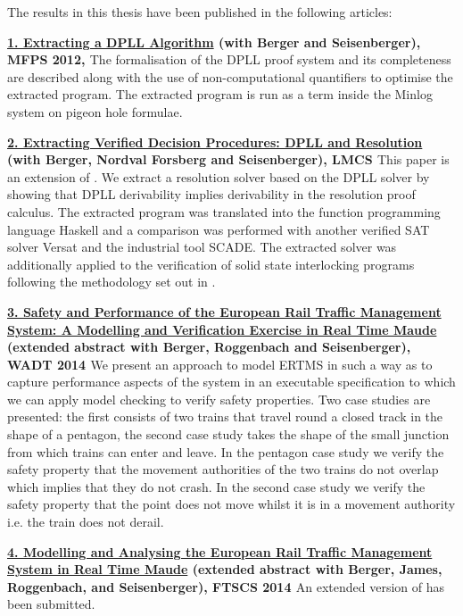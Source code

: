 The results in this thesis have been published in the following articles:

\textbf{\ul{1. Extracting a DPLL Algorithm} (with Berger and Seisenberger), MFPS 2012, \cite{AL12}}
The formalisation of the DPLL proof system and its completeness are described along with the use of non-computational quantifiers to optimise the extracted program. The extracted program is run as a term inside the Minlog system on pigeon hole formulae.


\textbf{\ul{2. Extracting Verified Decision Procedures: DPLL and Resolution} (with Berger, Nordval Forsberg and Seisenberger), LMCS  \cite{AL14b}}
This paper is an extension of \cite{AL12}. We extract a resolution solver based on the DPLL solver by showing that DPLL derivability implies derivability in the resolution proof calculus. The extracted program was translated into the function programming language Haskell and a comparison was performed with another verified SAT solver Versat and the industrial tool SCADE. The extracted solver was additionally applied to the verification of solid state interlocking programs following the methodology set out in \cite{AL14a}.



\textbf{\ul{3. Safety and Performance of the European Rail Traffic Management System: A Modelling and Verification Exercise in Real Time Maude} (extended abstract with Berger, Roggenbach and Seisenberger), WADT 2014 \cite{AL14c}} We present an approach to model ERTMS in such a way as to capture performance aspects of the system in an executable specification to which we can apply model checking to verify safety properties. Two case studies are presented: the first consists of two trains that travel round a closed track in the shape of a pentagon, the second case study takes the shape of the small junction from which trains can enter and leave. In the pentagon case study we verify the safety property that the movement authorities of the two trains do not overlap which implies that they do not crash. In the second case study we verify the safety property that the point does not move whilst it is in a movement authority i.e. the train does not derail.

\textbf{\ul{4. Modelling and Analysing the European Rail Traffic Management System in Real Time Maude} (extended abstract with Berger, James, Roggenbach, and Seisenberger), FTSCS 2014 \cite{AL14d}} An extended version of \cite{AL14c} has been submitted.



